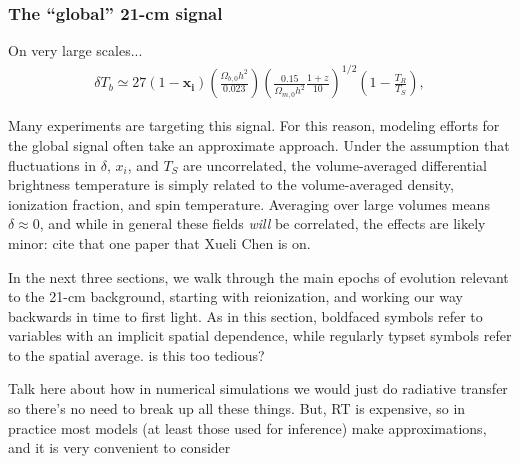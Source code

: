 \subsubsection{The ``global'' 21-cm signal}
On very large scales...
\begin{align}
    \delta T_b \simeq 27 (1 - \mathbf{x_i}) \left(\frac{\Omega_{b,0} h^2}{0.023} \right) \left(\frac{0.15}{\Omega_{m,0} h^2} \frac{1 + z}{10} \right)^{1/2} \left(1 - \frac{T_R}{T_S} \right) , \label{eq:dTb}
\end{align}

Many experiments are targeting this signal. For this reason, modeling efforts for the global signal often take an approximate approach. Under the assumption that fluctuations in $\delta$, $x_i$, and $T_S$ are uncorrelated, the volume-averaged differential brightness temperature is simply related to the volume-averaged density, ionization fraction, and spin temperature. Averaging over large volumes means $\delta \approx 0$, and while in general these fields \textit{will} be correlated, {\color{red} the effects are likely minor: cite that one paper that Xueli Chen is on.}


In the next three sections, we walk through the main epochs of evolution relevant to the 21-cm background, starting with reionization, and working our way backwards in time to first light. As in this section, boldfaced symbols refer to variables with an implicit spatial dependence, while regularly typset symbols refer to the spatial average. {\color{red} is this too tedious?}

Talk here about how in numerical simulations we would just do radiative transfer so there's no need to break up all these things. But, RT is expensive, so in practice most models (at least those used for inference) make approximations, and it is very convenient to consider

